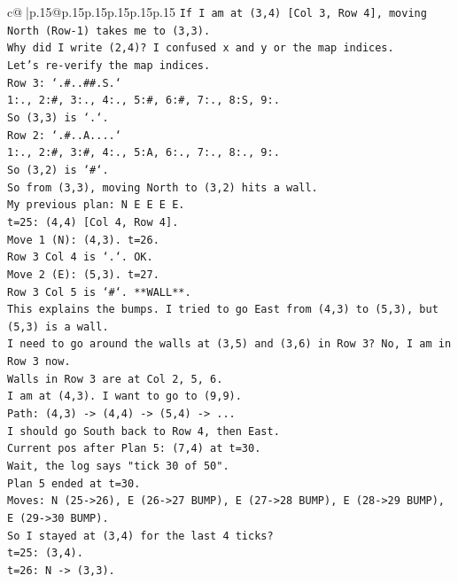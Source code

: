 \documentclass{article}
\begin{document}
{\begin{supertabular}{c@{$\;$}|p{.15\linewidth}@{}p{.15\linewidth}p{.15\linewidth}p{.15\linewidth}p{.15\linewidth}p{.15\linewidth}}
{{{\texttt{If I am at (3,4) {[}Col 3, Row 4{]}, moving North (Row{-}1) takes me to (3,3).} \\
\texttt{Why did I write (2,4)? I confused x and y or the map indices.} \\
\texttt{Let's re{-}verify the map indices.} \\
\texttt{Row 3: `.\#..\#\#.S.`} \\
\texttt{1:., 2:\#, 3:., 4:., 5:\#, 6:\#, 7:., 8:S, 9:.} \\
\texttt{So (3,3) is `.`.} \\
\texttt{Row 2: `.\#..A....`} \\
\texttt{1:., 2:\#, 3:\#, 4:., 5:A, 6:., 7:., 8:., 9:.} \\
\texttt{So (3,2) is `\#`.} \\
\texttt{So from (3,3), moving North to (3,2) hits a wall.} \\
\texttt{My previous plan: N E E E E.} \\
\texttt{t=25: (4,4) {[}Col 4, Row 4{]}.} \\
\texttt{Move 1 (N): (4,3). t=26.} \\
\texttt{Row 3 Col 4 is `.`. OK.} \\
\texttt{Move 2 (E): (5,3). t=27.} \\
\texttt{Row 3 Col 5 is `\#`. **WALL**.} \\
\texttt{This explains the bumps. I tried to go East from (4,3) to (5,3), but (5,3) is a wall.} \\
\texttt{I need to go around the walls at (3,5) and (3,6) in Row 3? No, I am in Row 3 now.} \\
\texttt{Walls in Row 3 are at Col 2, 5, 6.} \\
\texttt{I am at (4,3). I want to go to (9,9).} \\
\texttt{Path: (4,3) {-}> (4,4) {-}> (5,4) {-}> ...} \\
\texttt{I should go South back to Row 4, then East.} \\
\texttt{Current pos after Plan 5: (7,4) at t=30.} \\
\texttt{Wait, the log says "tick 30 of 50".} \\
\texttt{Plan 5 ended at t=30.} \\
\texttt{Moves: N (25{-}>26), E (26{-}>27 BUMP), E (27{-}>28 BUMP), E (28{-}>29 BUMP), E (29{-}>30 BUMP).} \\
\texttt{So I stayed at (3,4) for the last 4 ticks?} \\
\texttt{t=25: (3,4).} \\
\texttt{t=26: N {-}> (3,3).} \\
}}}
\end{supertabular}}
\end{document}
